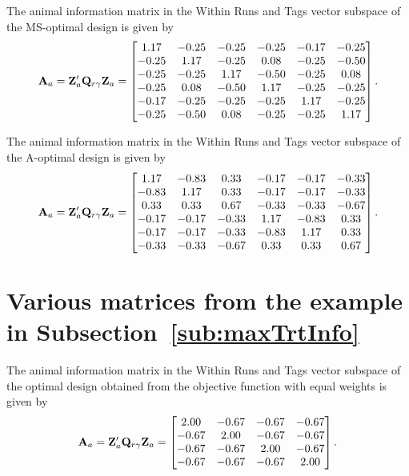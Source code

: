 The animal information matrix in the Within Runs and Tags vector subspace of the MS-optimal design is given by 
\[
\mathbf{A}_{a} = 
 \mathbf{Z}_{a}' \mathbf{Q}_{r\gamma} \mathbf{Z}_{a} = 
\begin{bmatrix} 
 1.17 & -0.25 & -0.25 & -0.25 & -0.17 & -0.25 \\ 
 -0.25 & 1.17 & -0.25 & 0.08 & -0.25 & -0.50 \\ 
 -0.25 & -0.25 & 1.17 & -0.50 & -0.25 & 0.08 \\ 
 -0.25 & 0.08 & -0.50 & 1.17 & -0.25 & -0.25 \\ 
 -0.17 & -0.25 & -0.25 & -0.25 & 1.17 & -0.25 \\ 
 -0.25 & -0.50 & 0.08 & -0.25 & -0.25 & 1.17 \\ 
\end{bmatrix}.  
\]


The animal information matrix in the Within Runs and Tags vector subspace of the A-optimal design is given by 
\[
\mathbf{A}_{a} = 
 \mathbf{Z}_{a}' \mathbf{Q}_{r\gamma} \mathbf{Z}_{a} = 
\begin{bmatrix} 
  1.17 & -0.83 & 0.33 & -0.17 & -0.17 & -0.33 \\ 
 -0.83 & 1.17 & 0.33 & -0.17 & -0.17 & -0.33 \\ 
 0.33 & 0.33 & 0.67 & -0.33 & -0.33 & -0.67 \\ 
 -0.17 & -0.17 & -0.33 & 1.17 & -0.83 & 0.33 \\ 
 -0.17 & -0.17 & -0.33 & -0.83 & 1.17 & 0.33 \\ 
 -0.33 & -0.33 & -0.67 & 0.33 & 0.33 & 0.67 \\ 
\end{bmatrix}.  
\]


\chapter{Various matrices from the example in Subsection~\ref{sub:maxTrtInfo}} \label{append:maxTrtInfo}
The animal information matrix in the Within Runs and Tags vector subspace of the optimal design obtained from the objective function with equal weights is given by 
\[
\mathbf{A}_{a} = 
 \mathbf{Z}_{a}' \mathbf{Q}_{r\gamma} \mathbf{Z}_{a} = 
\begin{bmatrix} 
 2.00 & -0.67 & -0.67 & -0.67 \\ 
 -0.67 & 2.00 & -0.67 & -0.67 \\ 
 -0.67 & -0.67 & 2.00 & -0.67 \\ 
 -0.67 & -0.67 & -0.67 & 2.00 \\ 
\end{bmatrix}.  
\]


